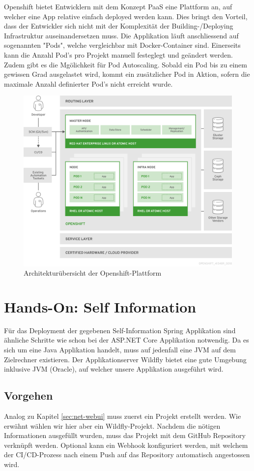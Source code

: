 \documentclass[12pt,a4paper]{article}
\begin{document}
Openshift bietet Entwicklern mit dem Konzept PaaS eine Plattform an, auf welcher eine App relative einfach deployed werden kann. Dies bringt den Vorteil, dass der Entwickler sich nicht mit der Komplexität der Building-/Deploying Infrastruktur auseinandersetzen muss.
Die Applikation läuft anschliessend auf sogenannten "Pods", welche vergleichbar mit Docker-Container sind. Einerseits kann die Anzahl Pod's pro Projekt manuell festeglegt und geändert werden. Zudem gibt es die Mgölichkeit für Pod Autoscaling. Sobald ein Pod bis zu
einem gewissen Grad ausgelastet wird, kommt ein zusätzlicher Pod in Aktion, sofern die maximale Anzahl definierter Pod's nicht erreicht wurde.

\begin{figure}[h]
	\centering
	\includegraphics[width=0.7\linewidth]{img/os-architecture}
	\caption{Architekturübersicht der Openshift-Plattform}
	\label{fig:os-architecture}
\end{figure}

\section{Hands-On: Self Information}
Für das Deployment der gegebenen Self-Information Spring Applikation sind ähnliche Schritte wie schon bei der ASP.NET Core Applikation notwendig. Da es sich um eine Java Applikation handelt, muss auf jedenfall eine JVM auf dem Zielrechner existieren. Der Applikationserver Wildfly bietet eine gute Umgebung inklusive JVM (Oracle), auf welcher unsere Applikation ausgeführt wird. 

\subsection{Vorgehen}
Analog zu Kapitel \ref{sec:net-webui} muss zuerst ein Projekt erstellt werden. Wie erwähnt wählen wir hier aber ein Wildfly-Projekt. Nachdem die nötigen Informationen ausgefüllt wurden, muss das Projekt mit dem GitHub Repository verknüpft werden. Optional kann ein Webhook konfiguriert werden, mit welchem der CI/CD-Prozess nach einem Push auf das Repository automatisch angestossen wird. 
\end{document}
